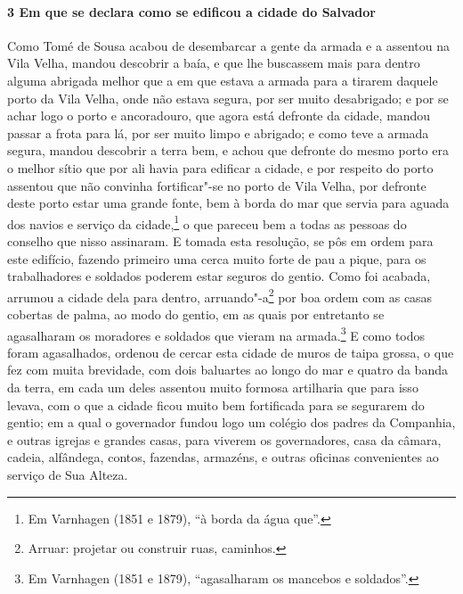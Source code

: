 \begin{linenumbers}
\paragraph{3 Em que se declara como se edificou a cidade do Salvador} \quad
Como Tomé de Sousa acabou de desembarcar a gente da armada e a assentou na Vila Velha,
mandou descobrir a baía, e que lhe buscassem mais para dentro alguma abrigada melhor que a
em que estava a armada para a tirarem daquele porto da Vila Velha, onde não estava segura,
por ser muito desabrigado; e por se achar logo o porto e ancoradouro, que agora está
defronte da cidade, mandou passar a frota para lá, por ser muito limpo e abrigado; e como
teve a armada segura, mandou descobrir a terra bem, e achou que defronte do mesmo porto
era o melhor sítio que por ali havia para edificar a cidade, e por respeito do porto
assentou que não convinha fortificar"-se no porto de Vila Velha, por defronte deste porto
estar uma grande fonte, bem à borda do mar que servia para aguada dos navios e serviço da
cidade,\footnote{ Em Varnhagen (1851 e 1879), ``à borda da água que''.} o que pareceu bem
a todas as pessoas do conselho que nisso assinaram. E tomada esta resolução, se pôs em
ordem para este edifício, fazendo primeiro uma cerca muito forte de pau a pique, para os
trabalhadores e soldados poderem estar seguros do gentio. Como foi acabada, arrumou a
cidade dela para dentro, arruando"-a\footnote{ Arruar: projetar ou construir ruas,
caminhos.} por boa ordem com as casas cobertas de palma, ao modo do gentio, em 
as quais por entretanto se agasalharam os moradores e soldados que vieram na
armada.\footnote{ Em Varnhagen (1851 e 1879), ``agasalharam os mancebos e soldados''.} E
como todos foram agasalhados, ordenou de cercar esta cidade de muros de taipa grossa, o
que fez com muita brevidade, com dois baluartes ao longo do mar e quatro da banda da
terra, em cada um deles assentou muito formosa artilharia que para isso levava, com o que
a cidade ficou muito bem fortificada para se segurarem do gentio; em a qual o governador
fundou logo um colégio dos padres da Companhia, e outras igrejas e grandes casas, para
viverem os governadores, casa da câmara, cadeia, alfândega, contos, fazendas, armazéns, e
outras oficinas convenientes ao serviço de Sua Alteza.


\end{linenumbers}
